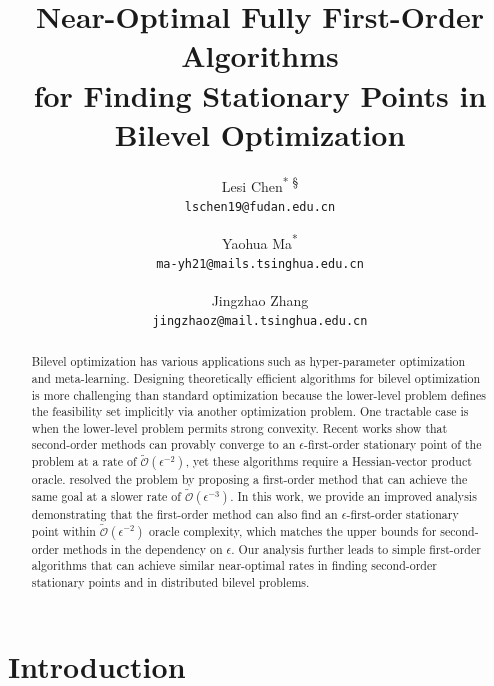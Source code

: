 \documentclass{article}
\title{Near-Optimal Fully First-Order Algorithms \\for Finding  Stationary Points in Bilevel Optimization}
\author{
  Lesi Chen\textsuperscript{* \S}\\
 { \small{\texttt{lschen19@fudan.edu.cn}}}
  \and
  Yaohua Ma\textsuperscript{* \dag}\\
 { \small{\texttt{ma-yh21@mails.tsinghua.edu.cn}}}
  \and 
  Jingzhao Zhang\textsuperscript{ \dag}\\
 { \small{\texttt{jingzhaoz@mail.tsinghua.edu.cn}}}
}
\date{}
\begin{document}
\maketitle
\begingroup
\begin{NoHyper}
\renewcommand\thefootnote{*}
\renewcommand\thefootnote{\S}
\renewcommand\thefootnote{\dag}
\end{NoHyper}
\endgroup
\begin{abstract}
Bilevel optimization has various applications such as hyper-parameter optimization and meta-learning.
Designing theoretically efficient algorithms for bilevel optimization is more challenging than standard optimization because the lower-level problem defines the feasibility set implicitly via another optimization problem. 
One tractable case is when the lower-level problem permits strong convexity. Recent works show that second-order methods can provably converge to
an $\epsilon$-first-order stationary point of the problem 
at a  rate of $\tilde{\mathcal{O}}(\epsilon^{-2})$, yet these algorithms require a Hessian-vector product oracle.
\citet{kwon2023fully} resolved the problem by proposing a  first-order method that can achieve the same goal at a slower
rate of $\tilde{\mathcal{O}}(\epsilon^{-3})$. 
In this work, we provide an improved analysis demonstrating that the first-order method can also 
find an $\epsilon$-first-order stationary point within $\tilde {\mathcal{O}}(\epsilon^{-2})$ oracle complexity, which matches
the upper bounds for second-order methods in the dependency on $\epsilon$.
Our analysis further leads to
simple first-order algorithms that can achieve similar near-optimal rates in finding second-order stationary points and in distributed bilevel problems.
\end{abstract}

\section{Introduction}
\end{document}
